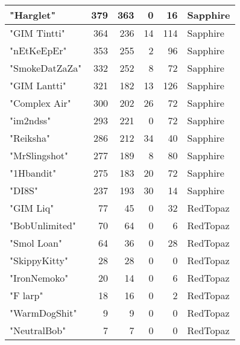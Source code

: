 \documentclass{article}
\begin{document}
\begin{table}[htbp]
\begin{tabular}{|l|r|r|r|r|l|}
"Harglet" & 379 & 363 & 0 & 16 & Sapphire \\ \hline
"GIM Tintti" & 364 & 236 & 14 & 114 & Sapphire \\ \hline
"nEtKeEpEr" & 353 & 255 & 2 & 96 & Sapphire \\ \hline
"SmokeDatZaZa" & 332 & 252 & 8 & 72 & Sapphire \\ \hline
"GIM Lantti" & 321 & 182 & 13 & 126 & Sapphire \\ \hline
"Complex Air" & 300 & 202 & 26 & 72 & Sapphire \\ \hline
"im2ndss" & 293 & 221 & 0 & 72 & Sapphire \\ \hline
"Reiksha" & 286 & 212 & 34 & 40 & Sapphire \\ \hline
"MrSlingshot" & 277 & 189 & 8 & 80 & Sapphire \\ \hline
"1Hbandit" & 275 & 183 & 20 & 72 & Sapphire \\ \hline
"DI8S" & 237 & 193 & 30 & 14 & Sapphire \\ \hline
"GIM Liq" & 77 & 45 & 0 & 32 & RedTopaz \\ \hline
"BobUnlimited" & 70 & 64 & 0 & 6 & RedTopaz \\ \hline
"Smol Loan" & 64 & 36 & 0 & 28 & RedTopaz \\ \hline
"SkippyKitty" & 28 & 28 & 0 & 0 & RedTopaz \\ \hline
"IronNemoko" & 20 & 14 & 0 & 6 & RedTopaz \\ \hline
"F larp" & 18 & 16 & 0 & 2 & RedTopaz \\ \hline
"WarmDogShit" & 9 & 9 & 0 & 0 & RedTopaz \\ \hline
"NeutralBob" & 7 & 7 & 0 & 0 & RedTopaz \\ \hline
\end{tabular}
\end{table}
\end{document}
